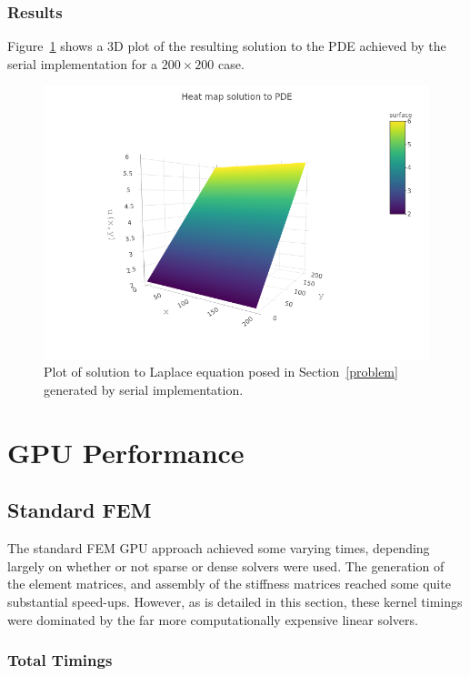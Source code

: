\subsubsection{Results}

Figure~\ref{fig:results} shows a 3D plot of the resulting solution to the PDE achieved by the serial implementation for a $200\times 200$ case.

\begin{figure}
	\centering
	\includegraphics[width = 0.8\linewidth]{Plots/3d_soln}
	\caption{Plot of solution to Laplace equation posed in Section~\ref{problem} generated by serial implementation.}
	\label{fig:results}
\end{figure}
\section{GPU Performance}

\subsection{Standard FEM}

The standard FEM GPU approach achieved some varying times, depending largely on whether or not sparse or dense solvers were used. The generation of the element matrices, and assembly of the stiffness matrices reached some quite substantial speed-ups. However, as is detailed in this section, these kernel timings were dominated by the far more computationally expensive linear solvers.

\subsubsection{Total Timings}

